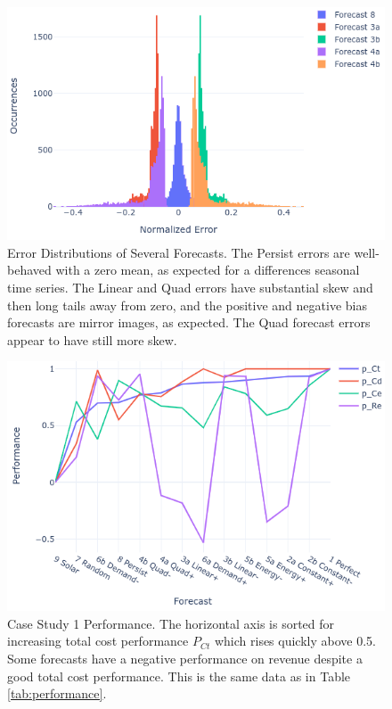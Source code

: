 \documentclass[conference]{IEEEtran}
\begin{document}
\begin{figure}
    \centering
    \includegraphics[width=1\linewidth]{hist.png}
    \caption{Error Distributions of Several Forecasts. The Persist errors are well-behaved with a zero mean, as expected for a differences seasonal time series. The Linear and Quad errors have substantial skew and then long tails away from zero, and the positive and negative bias forecasts are mirror images, as expected. The Quad forecast errors appear to have still more skew.}
    \label{fig:hist}
\end{figure}

\begin{figure}
    \centering
    \includegraphics[width=1\linewidth]{perf_lines.png}
    \caption{Case Study 1 Performance. The horizontal axis is sorted for increasing total cost performance $P_{Ct}$ which rises quickly above 0.5. Some forecasts have a negative performance on revenue despite a good total cost performance. This is the same data as in Table \ref{tab:performance}.}
    \label{fig:perf-lines}
\end{figure}
\end{document}
